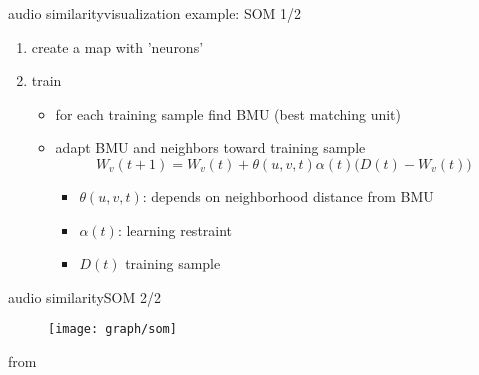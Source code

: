         \begin{frame}{audio similarity}{visualization example: SOM 1/2}
            \vspace{-3mm}
                    \begin{enumerate}
                        \item	create a map with 'neurons'
                        \item<1->	train
                                \begin{itemize}
                                    \item	for each training sample find BMU (best matching unit)
                                    \item	adapt BMU and neighbors toward training sample
                                    \begin{equation*}
                                        W_v(t + 1) = W_v(t) + \theta (u, v, t) \alpha(t)\big(D(t) - W_v(t)\big)
                                    \end{equation*}
                                    \begin{footnotesize}
                                        \begin{itemize}
                                            \item	$\theta (u, v, t)$: depends on neighborhood distance from BMU
                                            \item	$\alpha (t)$: learning restraint
                                            \item	$D(t)$ training sample
                                        \end{itemize}
                                    \end{footnotesize}
                                \end{itemize}
                    \end{enumerate}
        \end{frame}
        \begin{frame}{audio similarity}{SOM 2/2}
            \vspace{-2mm}
            \begin{figure}
                \centering
                \texttt{[image: graph/som]}
            \end{figure}
            \vspace{-10mm}from 
        \end{frame}
        
